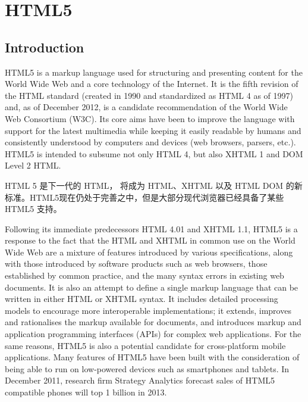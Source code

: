 \part{HTML5}


\chapter{Introduction}

HTML5 is a markup language used for structuring and presenting content for the World Wide Web and a core technology of the Internet. It is the fifth revision of the HTML standard (created in 1990 and standardized as HTML 4 as of 1997) and, as of December 2012, is a candidate recommendation of the World Wide Web Consortium (W3C). Its core aims have been to improve the language with support for the latest multimedia while keeping it easily readable by humans and consistently understood by computers and devices (web browsers, parsers, etc.). HTML5 is intended to subsume not only HTML 4, but also XHTML 1 and DOM Level 2 HTML.

HTML 5 是下一代的 HTML， 将成为 HTML、XHTML 以及 HTML DOM 的新标准。HTML5现在仍处于完善之中，但是大部分现代浏览器已经具备了某些 HTML5 支持。



Following its immediate predecessors HTML 4.01 and XHTML 1.1, HTML5 is a response to the fact that the HTML and XHTML in common use on the World Wide Web are a mixture of features introduced by various specifications, along with those introduced by software products such as web browsers, those established by common practice, and the many syntax errors in existing web documents. It is also an attempt to define a single markup language that can be written in either HTML or XHTML syntax. It includes detailed processing models to encourage more interoperable implementations; it extends, improves and rationalises the markup available for documents, and introduces markup and application programming interfaces (APIs) for complex web applications. For the same reasons, HTML5 is also a potential candidate for cross-platform mobile applications. Many features of HTML5 have been built with the consideration of being able to run on low-powered devices such as smartphones and tablets. In December 2011, research firm Strategy Analytics forecast sales of HTML5 compatible phones will top 1 billion in 2013.



